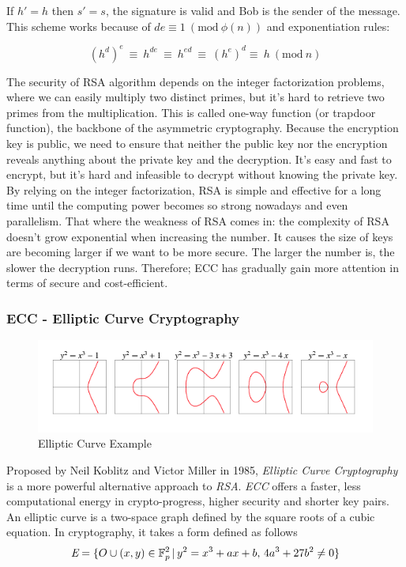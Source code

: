 If $h' = h$ then $s' = s$, the signature is valid and Bob is the sender of the message. This scheme works because of $de \equiv 1\ (\textrm{mod}\ \phi(n))$ and exponentiation rules:

\begin{equation}
  (h^d)^e\ \equiv\ h^{de}\ \equiv\ h^{ed}\ \equiv\ (h^e)^d \equiv\ h \ (\textrm{mod}\ n)
\end{equation}

The security of RSA algorithm depends on the integer factorization problems, where we can easily multiply two distinct primes, but it's hard to retrieve two primes from the multiplication. This is called one-way function (or trapdoor function), the backbone of the asymmetric cryptography. Because the encryption key is public, we need to ensure that neither the public key nor the encryption reveals anything about the private key and the decryption. It's easy and fast to encrypt, but it's hard and infeasible to decrypt without knowing the private key. By relying on the integer factorization, RSA is simple and effective for a long time until the computing power becomes so strong nowadays and even parallelism. That where the weakness of RSA comes in: the complexity of RSA doesn't grow exponential when increasing the number. It causes the size of keys are becoming larger if we want to be more secure. The larger the number is, the slower the decryption runs. Therefore; ECC has gradually gain more attention in terms of secure and cost-efficient.

\subsubsection{ECC - Elliptic Curve Cryptography}
\begin{figure}[ht!]
  \centering
  \includegraphics[width=1\textwidth]{images/example_curve.png}
  \caption[Elliptic Curve Example]{Elliptic Curve Example}
  \label{fig:ec_example}
\end{figure}

Proposed by Neil Koblitz and Victor Miller in 1985, \emph{Elliptic Curve Cryptography} is a more powerful alternative approach to \emph{RSA}. \emph{ECC} offers a faster, less computational energy in crypto-progress, higher security and shorter key pairs.
An elliptic curve is a two-space graph defined by the square roots of a cubic equation. In cryptography, it takes a form defined as follows
\begin{equation}
  \emph{E} = \{{O}\cup{(x,y)\in \mathbb{F}_{p}^2 \,|\, y^2 = x^3 + ax + b, \, 4a^3 + 27b^2 \neq 0}\}
\end{equation}

